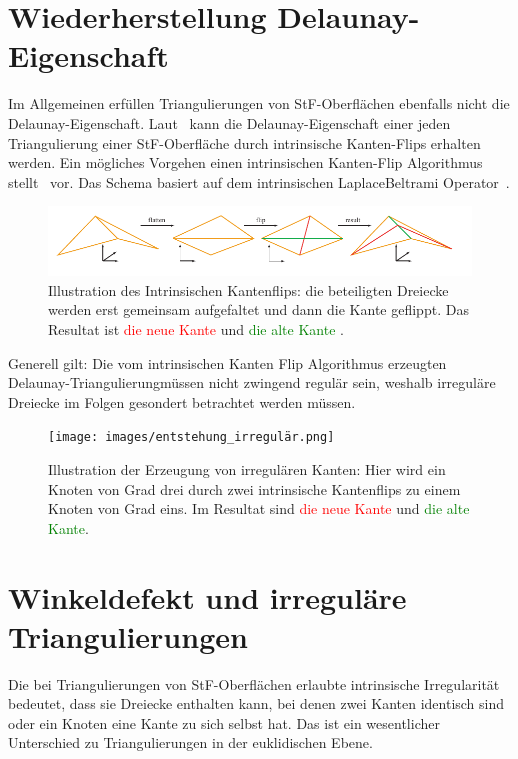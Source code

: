 \section*{Wiederherstellung Delaunay-Eigenschaft}
Im Allgemeinen erfüllen Triangulierungen von StF-Oberflächen ebenfalls nicht die Delaunay-Eigenschaft. Laut~\citet{Bobenko:2007:LaplaceBeltrami} kann die Delaunay-Eigenschaft einer jeden Triangulierung einer StF-Oberfläche durch intrinsische Kanten-Flips erhalten werden.
Ein mögliches Vorgehen einen intrinsischen Kanten-Flip Algorithmus stellt~\citet{Bobenko:2006:SIGGRAPH} vor. Das Schema basiert auf dem intrinsischen LaplaceBeltrami Operator~\cite{Bobenko:2007:LaplaceBeltrami}.
 \begin{figure}[H]
    \centering
    \includegraphics[width=5in]{images/intrinische_Kantenflip.png}
    \caption{Illustration des Intrinsischen Kantenflips: die beteiligten Dreiecke werden erst gemeinsam  aufgefaltet und dann die Kante geflippt.  Das Resultat ist  \textcolor{red}{die neue Kante} und \textcolor{green}{die alte Kante}  \cite{Bobenko:2006:SIGGRAPH}. }%
\end{figure}
Generell gilt: Die vom intrinsischen Kanten Flip Algorithmus erzeugten Delaunay-Triangulierungmüssen nicht zwingend regulär sein, weshalb irreguläre Dreiecke im Folgen gesondert betrachtet werden müssen. 
 \begin{figure}[H]
    \centering
    \texttt{[image: images/entstehung\_irregulär.png]}
    \caption{Illustration der Erzeugung von irregulären Kanten: Hier wird ein Knoten von Grad drei durch zwei intrinsische Kantenflips zu einem Knoten von Grad eins. Im Resultat sind \textcolor{red}{die neue Kante} und \textcolor{green}{die alte Kante}\cite{Bobenko:2006:SIGGRAPH}. }%
\end{figure}



\section*{Winkeldefekt und irreguläre Triangulierungen}
Die bei Triangulierungen von StF-Oberflächen erlaubte intrinsische Irregularität bedeutet, dass sie Dreiecke enthalten kann, bei denen zwei Kanten identisch sind oder ein Knoten eine Kante zu sich selbst hat. Das ist ein wesentlicher Unterschied zu Triangulierungen in der euklidischen Ebene. \\

